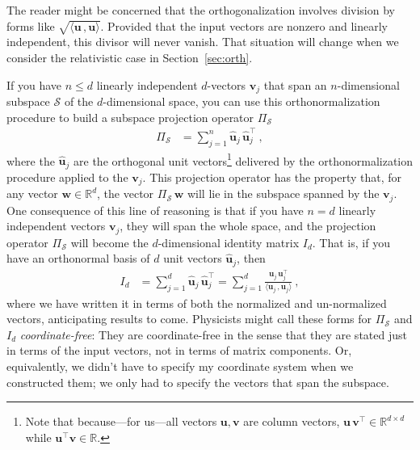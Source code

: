 \documentclass{article}
\newcommand{\Evec}[1]{{\mathbf{#1}}} %
\newcommand{\Ehat}[1]{{\mathbf{\hat{#1}}}} %
\newcommand{\inner}[2]{\langle{#1}\,,{#2}\rangle}
\newcommand{\secref}[1]{Section~\ref{#1}}
\begin{document}
The reader might be concerned that the orthogonalization involves division by forms like $\sqrt{\inner{\Evec{u}}{\Evec{u}}}$.
Provided that the input vectors are nonzero and linearly independent, this divisor will never vanish.
That situation will change when we consider the relativistic case in \secref{sec:orth}.

If you have $n\leq d$ linearly independent $d$-vectors $\Evec{v}_j$ that span an $n$-dimensional subspace $\mathscr{S}$ of the $d$-dimensional space, you can use this orthonormalization procedure to build a subspace projection operator $\Pi_\mathscr{S}$
\begin{align}\label{eq:oproj}
    \Pi_\mathscr{S} &= \sum_{j=1}^n \Ehat{u}_j\,\Ehat{u}_j^\top ~,
\end{align}
where the $\Ehat{u}_j$ are the orthogonal unit vectors\footnote{Note that because---for us---all vectors $\Evec{u},\Evec{v}$ are column vectors, $\Evec{u}\,\Evec{v}^\top\in\mathbb{R}^{d\times d}$ while $\Evec{u}^\top \Evec{v}\in\mathbb{R}$.} delivered by the orthonormalization procedure applied to the $\Evec{v}_j$.
This projection operator has the property that, for any vector $\Evec{w}\in\mathbb{R}^d$, the vector $\Pi_\mathscr{S}\,\Evec{w}$ will lie in the subspace spanned by the $\Evec{v}_j$.
One consequence of this line of reasoning is that if you have $n=d$ linearly independent vectors $\Evec{v}_j$, they will span the whole space, and the projection operator $\Pi_\mathscr{S}$ will become the $d$-dimensional identity matrix $I_d$.
That is, if you have an orthonormal basis of $d$ unit vectors $\Ehat{u}_j$, then
\begin{align}\label{eq:oI}
    I_d &= \sum_{j=1}^d \Ehat{u}_j\,\Ehat{u}_j^\top = \sum_{j=1}^d \frac{\Evec{u}_j\,\Evec{u}_j^\top}{\inner{\Evec{u}_j}{\Evec{u}_j}} ~,
\end{align}
where we have written it in terms of both the normalized and un-normalized vectors, anticipating results to come.
Physicists might call these forms for $\Pi_\mathscr{S}$ and $I_d$ \emph{coordinate-free}:
They are coordinate-free in the sense that they are stated just in terms of the input vectors, not in terms of matrix components.
Or, equivalently, we didn't have to specify my coordinate system when we constructed them; we only had to specify the vectors that span the subspace.
\end{document}

